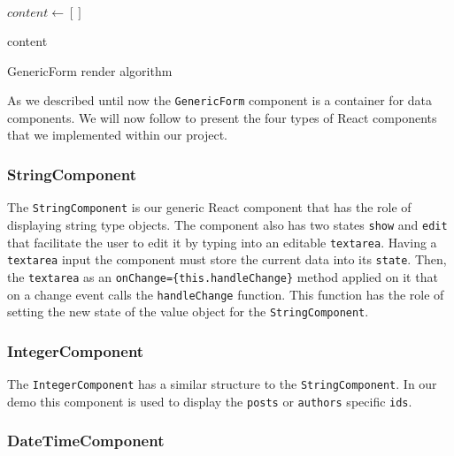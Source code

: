\begin{algorithm}[H]
$content \leftarrow []$

\Return content
\label{algo1}
\caption{GenericForm render algorithm}
\end{algorithm}

As we described until now the \texttt{GenericForm} component is a container for data components. We will now follow to present the four types of React components that we implemented within our project.

\subsubsection{StringComponent}
\label{sub-sub-sec:string}

The \texttt{StringComponent} is our generic React component that has the role of displaying string type objects. The component also has two states \texttt{show} and \texttt{edit} that facilitate the user to edit it by typing into an editable \texttt{textarea}. Having a \texttt{textarea} input the component must store the current data into its \texttt{state}. Then, the \texttt{textarea} as an \texttt{onChange=\{this.handleChange\}} method applied on it that on a change event calls the \texttt{handleChange} function. This function has the role of setting the new state of the value object for the \texttt{StringComponent}.

\subsubsection{IntegerComponent}
\label{sub-sub-sec:integer}

The \texttt{IntegerComponent} has a similar structure to the \texttt{StringComponent}. In our demo this component is used to display the \texttt{posts} or \texttt{authors} specific \texttt{ids}. 

\subsubsection{DateTimeComponent}
\label{sub-sub-sec:date}

